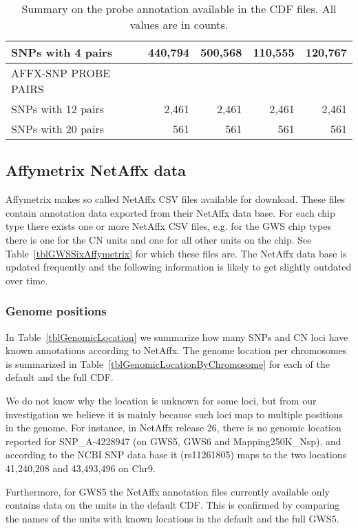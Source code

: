 \documentclass[10pt,a4paper]{article}
\begin{document}
\begin{table}[htp]
\begin{center}
\begin{tabular}{|l|rr||rr|}
SNPs with 4 pairs       &  440,794  &  500,568  &    110,555 &   120,767 \\
\hline
AFFX-SNP PROBE PAIRS     &	         &	  			 &	 				  &	 		      \\
SNPs with 12 pairs       &    2,461  &    2,461  &     2,461  &     2,461 \\
SNPs with 20 pairs       &      561  &      561  &       561  &       561 \\
\hline
\end{tabular}
\end{center}
\caption{Summary on the probe annotation available in the CDF files.  All values are in counts.}    %
\label{tblCdfProbes}
\end{table}



\subsection{Affymetrix NetAffx data}

Affymetrix makes so called NetAffx CSV files available for download.  These files contain annotation data exported from their NetAffx data base.  For each chip type there exists one or more NetAffx CSV files, e.g. for the GWS chip types there is one for the CN units and one for all other units on the chip.  See Table~\ref{tblGWSSixAffymetrix} for which these files are.
The NetAffx data base is updated frequently and the following information is likely to get slightly outdated over time. 

\subsubsection{Genome positions}
In Table~\ref{tblGenomicLocation} we summarize how many SNPs and CN loci have known annotations according to NetAffx.  
The genome location per chromosomes is summarized in Table~\ref{tblGenomicLocationByChromosome} for each of the default and the full CDF.

We do not know why the location is unknown for some loci, but from our investigation we believe it is mainly because such loci map to multiple positions in the genome.  For instance, in NetAffx release 26, there is no genomic location reported for SNP\_A-4228947 (on GWS5, GWS6 and Mapping250K\_Nsp), and according to the NCBI SNP data base it (rs11261805) maps to the two locations 41,240,208 and 43,493,496 on Chr9.

Furthermore, for GWS5 the NetAffx annotation files currently available only contains data on the units in the default CDF.  This is confirmed by comparing the names of the units with known locations in the default and the full GWS5.
\end{document}
